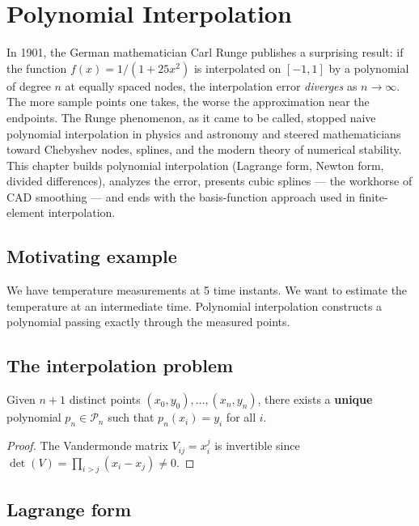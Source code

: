 \chapter{Polynomial Interpolation}
\label{ch:interpolation}

In 1901, the German mathematician Carl Runge publishes a surprising result: if the function $f(x) = 1/(1+25x^2)$ is interpolated on $[-1,1]$ by a polynomial of degree $n$ at equally spaced nodes, the interpolation error \emph{diverges} as $n \to \infty$. The more sample points one takes, the worse the approximation near the endpoints. The Runge phenomenon, as it came to be called, stopped naive polynomial interpolation in physics and astronomy and steered mathematicians toward Chebyshev nodes, splines, and the modern theory of numerical stability. This chapter builds polynomial interpolation (Lagrange form, Newton form, divided differences), analyzes the error, presents cubic splines --- the workhorse of CAD smoothing --- and ends with the basis-function approach used in finite-element interpolation.

\section{Motivating example}
We have temperature measurements at 5 time instants. We want to estimate the temperature at an intermediate time. Polynomial interpolation constructs a polynomial passing exactly through the measured points.

\section{The interpolation problem}

\begin{theorem}
Given $n+1$ distinct points $(x_0,y_0),\ldots,(x_n,y_n)$, there exists a \textbf{unique} polynomial $p_n\in\mathcal{P}_n$ such that $p_n(x_i)=y_i$ for all $i$.
\end{theorem}

\begin{proof}
The Vandermonde matrix $V_{ij}=x_i^j$ is invertible since $\det(V)=\prod_{i>j}(x_i-x_j)\neq 0$.
\end{proof}

\section{Lagrange form}

